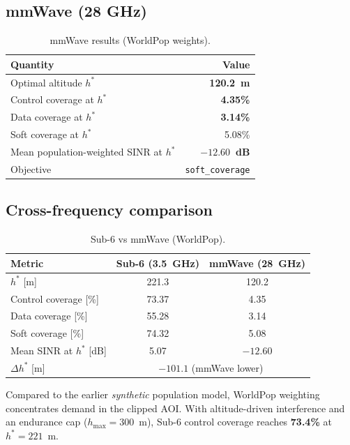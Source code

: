 \documentclass[11pt,a4paper]{article}
\begin{document}
\subsection{mmWave (28 GHz)}
\begin{table}[H]
\centering
\caption{mmWave results (WorldPop weights).}
\label{tab:mmwave}
\begin{tabular}{lr}
\toprule
Quantity & Value \\
\midrule
Optimal altitude $h^\ast$ & \textbf{120.2~m} \\
Control coverage at $h^\ast$ & \textbf{4.35\%} \\
Data coverage at $h^\ast$ & \textbf{3.14\%} \\
Soft coverage at $h^\ast$ & 5.08\% \\
Mean population-weighted SINR at $h^\ast$ & \textbf{$-12.60$~dB} \\
Objective & \texttt{soft\_coverage} \\
\bottomrule
\end{tabular}
\end{table}

\subsection{Cross-frequency comparison}
\begin{table}[H]
\centering
\caption{Sub-6 vs mmWave (WorldPop).}
\label{tab:compare}
\begin{tabular}{lcc}
\toprule
Metric & Sub-6 (3.5~GHz) & mmWave (28~GHz) \\
\midrule
$h^\ast$ [m] & 221.3 & 120.2 \\
Control coverage [\%] & 73.37 & 4.35 \\
Data coverage [\%] & 55.28 & 3.14 \\
Soft coverage [\%] & 74.32 & 5.08 \\
Mean SINR at $h^\ast$ [dB] & 5.07 & $-12.60$ \\
$\Delta h^\ast$ [m] & \multicolumn{2}{c}{\textbf{$-101.1$} (mmWave lower)} \\
\bottomrule
\end{tabular}
\end{table}

Compared to the earlier \emph{synthetic} population model, WorldPop weighting
concentrates demand in the clipped AOI. With altitude-driven interference and an
endurance cap ($h_{\max}=300$~m), Sub-6 control coverage reaches \textbf{73.4\%} at
$h^\ast = 221$~m.
\end{document}
